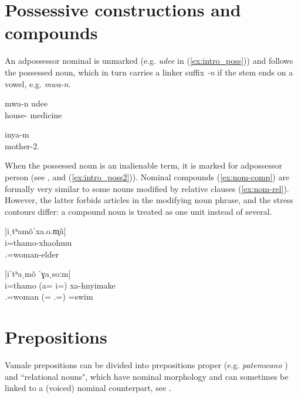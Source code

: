 \section{Possessive constructions and compounds}
An adpossessor nominal is unmarked (e.g. \textit{udee} in (\ref{ex:intro_poss})) and follows the possessed noun, which in turn carries a linker suffix \textit{-n} if the stem ends on a vowel, e.g. \textit{mwa-n}. 



	\ea\label{ex:intro_poss}
	\gll mwa-n udee\\	
	 house- medicine\\
	\glt {}
	\z
	
	\ea\label{ex:intro_poss2}
	\gll inya-m\\
	 mother-2.\\
	\glt {}
	\z

When the possessed noun is an inalienable term, it is marked for adpossessor person (see , and (\ref{ex:intro_poss2})). Nominal compounds (\ref{ex:nom-comp}) are formally very similar to some nouns modified by relative clauses (\ref{ex:nom-rel}). However, the latter forbids articles in the modifying noun phrase, and the stress contours differ: a compound noun is treated as one unit instead of several. 


\ea\label{ex:nom-comp}
[iˌtʰamõˈxa.o.m̥ũ]\\
\gll i=thamo-xhaohmu\\
 .=woman-elder\\
\glt {}
\z


\ea\label{ex:nom-rel}
[iˈtʰaˌmõ ˈɣaˌsoːm]\\
\gll i=thamo (a= i=) xa-hnyimake\\
 .=woman (= .=) =swim\\
\glt {}
\z

\section{Prepositions}

Vamale prepositions can be divided into prepositions proper (e.g. \textit{patemwano} ) and ``relational nouns", which have nominal morphology and can sometimes be linked to a (voiced) nominal counterpart, see . 

